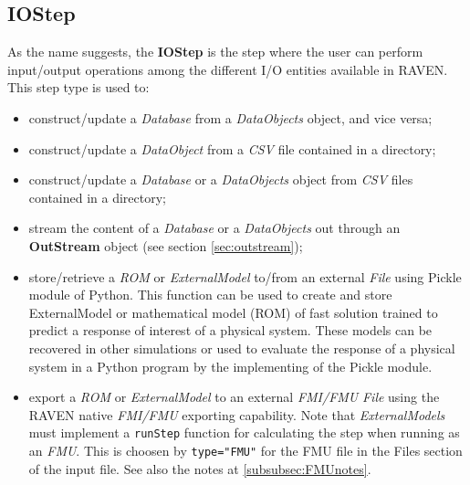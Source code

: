 \subsection{IOStep}
\label{subsec:stepIOStep}
As the name suggests, the \textbf{IOStep} is the step where the user can perform
input/output operations among the different I/O entities available in RAVEN.
%
This step type is used to:
\begin{itemize}
 \item construct/update a \textit{Database} from a \textit{DataObjects} object, and
   vice versa;
 \item construct/update a \textit{DataObject} from a
   \textit{CSV} file contained in a directory;
 \item construct/update a \textit{Database} or a \textit{DataObjects} object from
   \textit{CSV} files contained in a directory;
 \item stream the content of a \textit{Database} or a \textit{DataObjects} out through
   an \textbf{OutStream} object (see section \ref{sec:outstream});
 \item store/retrieve a \textit{ROM} or  \textit{ExternalModel} to/from an external \textit{File} using Pickle module
 of Python. This function can be used to create and store ExternalModel or mathematical model (ROM) of fast solution
 trained to predict a response of interest of a physical system. These models can be
recovered in other simulations or used to evaluate the response of a physical system
 in a Python program by the implementing of the Pickle module.
  \item export a \textit{ROM} or  \textit{ExternalModel} to an external \textit{FMI/FMU}  \textit{File} using the RAVEN native
  \textit{FMI/FMU} exporting capability. Note that \textit{ExternalModels} must implement a \texttt{runStep} function for calculating the step when running as an \textit{FMU}.  This is choosen by \verb|type="FMU"| for the FMU file in the Files section of the input file.  See also the notes at \ref{subsubsec:FMUnotes}.
\end{itemize}

